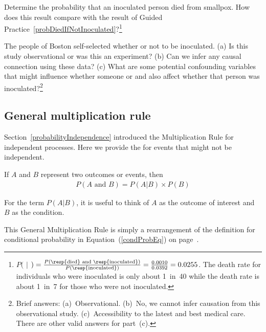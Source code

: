 \begin{exercise}
Determine the probability that an inoculated person died from smallpox. How does this result compare with the result of Guided Practice~\ref{probDiedIfNotInoculated}?\footnote{$P($ $|$ $) = \frac{P(\text{\resp{died} and \resp{inoculated}})}{P(\text{\resp{inoculated}})} = \frac{0.0010}{0.0392} = 0.0255$. The death rate for individuals who were inoculated is only about 1~in~40 while the death rate is about 1~in~7 for those who were not inoculated.}
\end{exercise}

\begin{exercise}\label{SmallpoxInoculationObsExpExercise}
The people of Boston self-selected whether or not to be inoculated. (a) Is this study observational or was this an experiment? (b) Can we infer any causal connection using these data? (c) What are some potential confounding variables that might influence whether someone  or  and also affect whether that person was inoculated?\footnote{Brief answers: (a)~Observational. (b)~No, we cannot infer causation from this observational study. (c)~Accessibility to the latest and best medical care. There are other valid answers for part~(c).}
\end{exercise}


\subsection{General multiplication rule}

Section~\ref{probabilityIndependence} introduced the Multiplication Rule for independent processes. Here we provide the  for events that might not be independent.

\begin{termBox}{
If $A$ and $B$ represent two outcomes or events, then \vspace{-1.5mm}
\begin{eqnarray*}
P(A\text{ and }B) = P(A | B)\times P(B)
\end{eqnarray*} \vspace{-6.5mm} \par
For the term $P(A | B)$, it is useful to think of $A$ as the outcome of interest and $B$ as the condition.}
\end{termBox}
This General Multiplication Rule is simply a rearrangement of the definition for conditional probability in Equation~(\ref{condProbEq}) on page~\pageref{condProbEq}.

